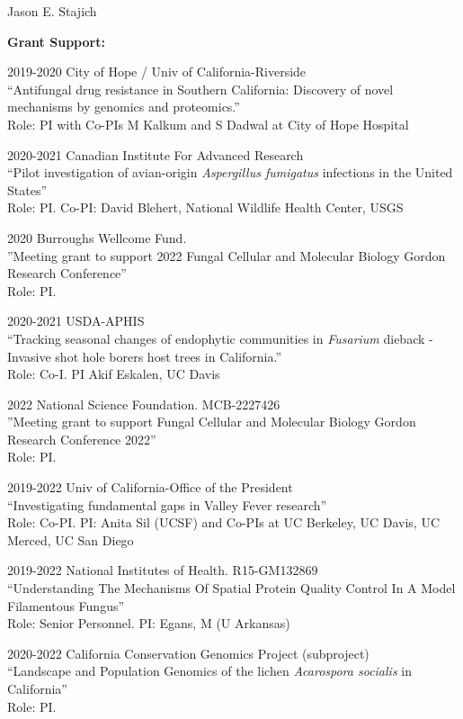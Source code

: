 \documentclass[10pt]{article}
\begin{document}
\begin{cv}{\centerline{Jason E. Stajich}}
\begin{cvlistcompact}{\bf Grant Support:}
\item [2019-2020] City of Hope / Univ of California-Riverside \\
``Antifungal drug resistance in Southern California: Discovery of
  novel mechanisms by genomics and proteomics.'' \\
Role: PI with Co-PIs M Kalkum and S Dadwal at City of Hope Hospital

\item [2020-2021] Canadian Institute For Advanced Research \\
  ``Pilot investigation of avian-origin \textit{Aspergillus fumigatus} infections
in the United States'' \\
Role: PI. Co-PI: David Blehert, National Wildlife Health Center, USGS

\item [2020] Burroughs Wellcome Fund. \\
''Meeting grant to support 2022 Fungal Cellular and Molecular Biology Gordon Research Conference'' \\
Role: PI.

\item [2020-2021] USDA-APHIS \\
``Tracking seasonal changes of endophytic communities in \textit{Fusarium} dieback - Invasive shot hole borers host trees in California.'' \\
Role: Co-I. PI Akif Eskalen, UC Davis

\item [2022] National Science Foundation. MCB-2227426 \\
''Meeting grant to support Fungal Cellular and Molecular Biology Gordon Research Conference 2022'' \\
Role: PI.

\item [2019-2022] Univ of California-Office of the President \\
``Investigating fundamental gaps in Valley Fever research'' \\
Role: Co-PI.  PI: Anita Sil (UCSF) and Co-PIs at UC Berkeley, UC
Davis, UC Merced, UC San Diego

\item [2019-2022] National Institutes of Health. R15-GM132869 \\
  ``Understanding The Mechanisms Of Spatial Protein Quality Control In A Model Filamentous Fungus'' \\
Role: Senior Personnel. PI: Egans, M (U Arkansas)

\item [2020-2022] California Conservation Genomics Project (subproject) \\
  ``Landscape and Population Genomics of the lichen \textit{Acarospora socialis} in California''  \\
Role: PI.


\end{cvlistcompact}
\end{cv}
\end{document}
